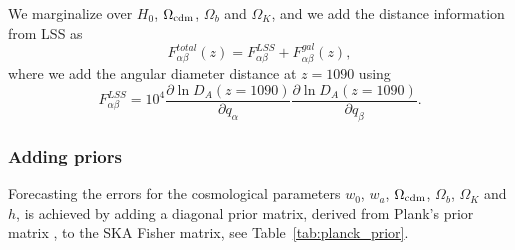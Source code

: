 \documentclass[useAMS,usenatbib]{mn2e}
\begin{document}
We marginalize over $H_0$, $\Omega_{{\rm cdm}}$, $\Omega_b$ and $\Omega_K$, and we add the distance information from LSS  as
\begin{equation}
F^{total}_{\alpha\beta}(z)=F^{LSS}_{\alpha\beta}
+F^{gal}_{\alpha\beta}(z),
\end{equation}
where we add the
angular diameter distance at $z=1090$ using
\begin{equation}\label{add_lss}
 F^{LSS}_{\alpha\beta} = 10^4 \frac{\partial \ln
  D_A(z=1090)}{\partial q_\alpha}\frac{\partial \ln D_A(z=1090)}{\partial q_\beta}.
\end{equation}
\subsubsection{ Adding priors}


Forecasting the errors for  the cosmological parameters $w_0$, $w_a$, $\Omega_{\rm cdm}$, $\Omega_b$, $\Omega_K$ and $h$, is  achieved by adding a diagonal  prior matrix,  derived from Plank's prior matrix \citep{2013LRR....16....6A}, to the SKA Fisher matrix, see Table~\ref{tab:planck_prior}.
\end{document}
